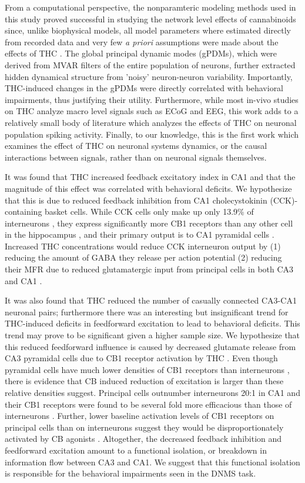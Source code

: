 \documentclass[11pt,a4paper,final]{article}
\begin{document}
From a computational perspective, the nonparamteric modeling methods used in this study proved successful in studying the network level effects of cannabinoids since, unlike biophysical models, all model parameters where estimated directly from recorded data and very few \textit{a priori} assumptions were made about the effects of THC \citep{marm04,song09par1,sandler15}.
The global principal dynamic modes (gPDMs), which were derived from MVAR filters of the entire population of neurons, further extracted hidden dynamical structure from 'noisy' neuron-neuron variability.
Importantly, THC-induced changes in the gPDMs were directly correlated with behavioral impairments, thus justifying their utility.
Furthermore, while most in-vivo studies on THC analyze macro level signals such as ECoG and EEG, this work adds to a relatively small body of literature which analyzes the effects of THC on neuronal population spiking activity.
Finally, to our knowledge, this is the first work which examines the effect of THC on neuronal systems dynamics, or the causal interactions between signals, rather than on neuronal signals themselves.

It was found that THC increased feedback excitatory index in CA1 and that the magnitude of this effect was correlated with behavioral deficits. 
We hypothesize that this is due to reduced feedback inhibition from CA1 cholecystokinin (CCK)-containing basket cells.
While CCK cells only make up only 13.9\% of interneurons \citep{bezaire13}, they express significantly more CB1 receptors than any other cell in the hippocampus \citep{katona00}, and their primary output is to CA1 pyramidal cells \citep{bezaire13}.
Increased THC concentrations would reduce CCK interneuron output by (1) reducing the amount of GABA they release per action potential (2) reducing their MFR due to reduced glutamatergic input from principal cells in both CA3 and CA1 \citep{gulyas04,lee10}.

It was also found that THC reduced the number of casually connected CA3-CA1 neuronal pairs; furthermore there was an interesting but insignificant trend for THC-induced deficits in feedforward excitation to lead to behavioral deficits.
This trend may prove to be significant given a higher sample size. 
We hypothesize that this reduced feedforward influence is caused by decreased glutamate release from CA3 pyramidal cells due to CB1 receptor activation by THC \citep{shen96}.
Even though pyramidal cells have much lower densities of CB1 receptors than interneurons \citep{katona00,ohno02}, there is evidence that CB induced reduction of excitation is larger than these relative densities suggest. 
Principal cells outnumber interneurons 20:1 in CA1 \citep{mehta09} and their CB1 receptors were found to be several fold more efficacious than those of interneurons \citep{steindel13}. 
Further, lower baseline activation levels of CB1 receptors on principal cells than on interneurons suggest they would be disproportionately activated by CB agonists \citep{ruehle12}. 
Altogether, the decreased feedback inhibition and feedforward excitation amount to a functional isolation, or breakdown in information flow between CA3 and CA1.
We suggest that this functional isolation is responsible for the behavioral impairments seen in the DNMS task.
\end{document}
